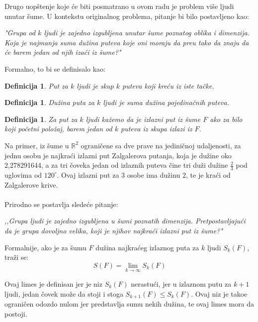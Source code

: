 \documentclass[11pt,letter]{article}
\newtheorem{df}[teo]{\bf Definicija}
\begin{document}
\indent Drugo uop\v stenje koje \' ce biti posmatrano u ovom radu je problem vi\v se ljudi unutar \v sume. U kontekstu originalnog problema, pitanje bi bilo postavljeno kao:
\begin{center}
\textit{"Grupa od $k$ ljudi je zajedno izgubljena unutar \v sume poznatog oblika i dimenzija. Koja je najmanja suma du\v zina puteva koje oni moraju da pre\dj u tako da znaju da \' ce barem jedan od njih iza\' ci iz \v sume?"}
\end{center}
\newpage
Formalno, to bi se definisalo kao:
\begin{df} Put za $k$ ljudi je skup $k$ puteva koji kre\' cu iz iste ta\v cke. \end{df}
\begin{df} Du\v zina puta za $k$ ljudi je suma du\v zina pojedina\v cnih puteva.\end{df}
\begin{df} Za put za $k$ ljudi ka\v zemo da je izlazni put iz \v sume $F$ ako za bilo koji po\v cetni polo\v zaj, barem jedan od $k$ puteva iz skupa izlazi iz $F$.\end{df}
\smallskip

\indent Na primer, iz \v sume u $\mathbb{R}^2$ ograni\v cene sa dve prave na jedini\v cnoj udaljenosti, za jednu osobu je najkra\' ci izlazni put Zalgalerova putanja, koja je du\v zine oko 2,278291644, a za tri \v coveka jedan od izlaznih puteva \v cine tri du\v zi du\v zine $\frac{2}{3}$ pod uglovima od $120^\circ$. Ovaj izlazni put za 3 osobe ima du\v zinu 2, te je kra\' ci od Zalgalerove krive.
\\
\smallskip
\\
\indent Prirodno se postavlja slede\' ce pitanje:
\begin{center}
\textit{,,Grupa ljudi je zajedno izgubljena u \v sumi poznatih dimenzija. Pretpostavljaju\' ci da je grupa dovoljno velika, koji je njihov najkra\' ci izlazni put iz \v sume?"}
\end{center}
Formalnije, ako je za \v sumu $F$ du\v zina najkra\' ceg izlaznog puta za $k$ ljudi $S_k(F)$, tra\v zi se:
$$S(F)=\lim_{k \to \infty} S_k(F)$$

\indent Ovaj limes je definisan jer je niz $S_k(F)$ nerastu\' ci, jer u izlaznom putu za $k+1$ ljudi, jedan \v covek mo\v ze da stoji i stoga $S_{k+1}(F)\leqslant S_{k}(F)$. Ovaj niz je tako\dj e ograni\v cen odozdo nulom jer predstavlja sumu nekih du\v zina, te ovaj limes mora da postoji. 
\\
\end{document}

